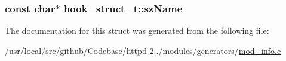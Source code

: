 \subsubsection[{\texorpdfstring{sz\+Name}{szName}}]{\setlength{\rightskip}{0pt plus 5cm}const char$\ast$ hook\+\_\+struct\+\_\+t\+::sz\+Name}\hypertarget{structhook__struct__t_a6bfaf69c37168581e15be4f6ee323ca3}{}\label{structhook__struct__t_a6bfaf69c37168581e15be4f6ee323ca3}


The documentation for this struct was generated from the following file\+:\begin{DoxyCompactItemize}
\item 
/usr/local/src/github/\+Codebase/httpd-\/2../modules/generators/\hyperlink{mod__info_8c}{mod\+\_\+info.\+c}\end{DoxyCompactItemize}
